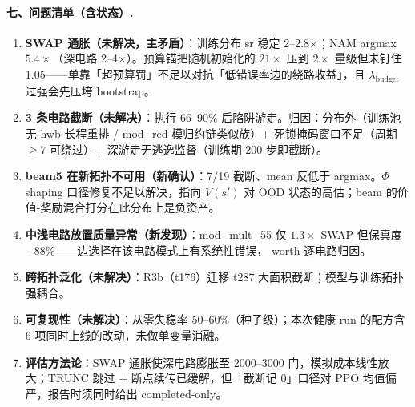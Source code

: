 \paragraph{七、问题清单（含状态）.}
\begin{enumerate}
    \item \textbf{SWAP 通胀（未解决，主矛盾）}：训练分布 sr 稳定 2--2.8$\times$；NAM argmax $5.4\times$（深电路 2--4$\times$）。预算锚把随机初始化的 $21\times$ 压到 $2\times$ 量级但未钉住 1.05——单靠「超预算罚」不足以对抗「低错误率边的绕路收益」，且 $\lambda_{\mathrm{budget}}$ 过强会先压垮 bootstrap。
    \item \textbf{3 条电路截断（未解决）}：执行 66--90\% 后陷阱游走。归因：分布外（训练池无 hwb 长程重排 / mod\_red 模归约链类似族）+ 死锁掩码窗口不足（周期 $\geq7$ 可绕过）+ 深游走无逃逸监督（训练期 200 步即截断）。
    \item \textbf{beam5 在新拓扑不可用（新确认）}：7/19 截断、mean 反低于 argmax。$\Phi$ shaping 口径修复不足以解决，指向 $V(s')$ 对 OOD 状态的高估；beam 的价值-奖励混合打分在此分布上是负资产。
    \item \textbf{中浅电路放置质量异常（新发现）}：mod\_mult\_55 仅 $1.3\times$ SWAP 但保真度 $-88\%$——边选择在该电路模式上有系统性错误， worth 逐电路归因。
    \item \textbf{跨拓扑泛化（未解决）}：R3b（t176）迁移 t287 大面积截断；模型与训练拓扑强耦合。
    \item \textbf{可复现性（未解决）}：从零失稳率 50--60\%（种子级）；本次健康 run 的配方含 6 项同时上线的改动，未做单变量消融。
    \item \textbf{评估方法论}：SWAP 通胀使深电路膨胀至 2000--3000 门，模拟成本线性放大；TRUNC 跳过 + 断点续传已缓解，但「截断记 0」口径对 PPO 均值偏严，报告时须同时给出 completed-only。
\end{enumerate}

